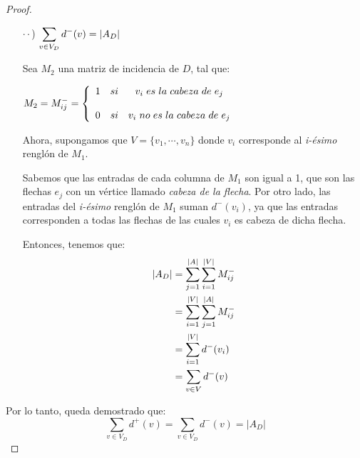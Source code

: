 \documentclass{article}
\begin{document}
\begin{enumerate}
\begin{proof}
\begin{itemize}
        \item[$\cdot\cdot$)] $\displaystyle \sum_{v \in V_{D}} d^{-}(v) = \abs{A_{D}}$

          Sea $M_{2}$ una matriz de incidencia de $D$, tal que:
          \begin{center}
            $M_{2} = M^{-}_{ij}
            = \left \{
            \begin{array}{lcc}
              1 &   si  & v_{i} \hspace{0.3em} es \hspace{0.3em} la \hspace{0.3em}
              cabeza \hspace{0.3em} de \hspace{0.3em} e_{j} \\
              \\0 &  si & v_{i} \hspace{0.3em} no \hspace{0.3em} es \hspace{0.3em}
              la \hspace{0.3em} cabeza \hspace{0.3em} de \hspace{0.3em} e_{j}
            \end{array}
            \right.$
          \end{center}
          Ahora, supongamos que $V = \{v_{1}, \cdots, v_{n}\}$ donde $v_{i}$
          corresponde al \textit{i-\'esimo} rengl\'on de $M_{1}$.

          Sabemos que las entradas de cada columna de $M_{1}$ son igual a 1,
          que son las flechas $e_{j}$ con un v\'ertice llamado \textit{cabeza de la flecha}.
          Por otro lado, las entradas del \textit{i-ésimo} rengl\'on de $M_{1}$
          suman $d^{-}(v_{i})$, ya que las entradas corresponden a todas las
          flechas de las cuales $v_{i}$ es cabeza de dicha flecha.

          Entonces, tenemos que:
          \begin{equation*}
            \begin{split}
              \abs{A_{D}} & = \sum_{j=1}^{\abs{A}} \sum_{i=1}^{\abs{V}} M^{-}_{ij} \\
              & = \sum_{i=1}^{\abs{V}} \sum_{j=1}^{\abs{A}} M^{-}_{ij} \\
              & = \sum_{i=1}^{\abs{V}} d^{-}(v_{i}) \\
              & = \sum_{v \in V} d^{-}(v)
            \end{split}
          \end{equation*}
      \end{itemize}
      Por lo tanto, queda demostrado que:
      \[
      \displaystyle \sum_{v \in V_D} d^+(v) = \sum_{v \in V_D} d^-(v) = |A_D|
      \]
    \end{proof}


\end{enumerate}
\end{document}
